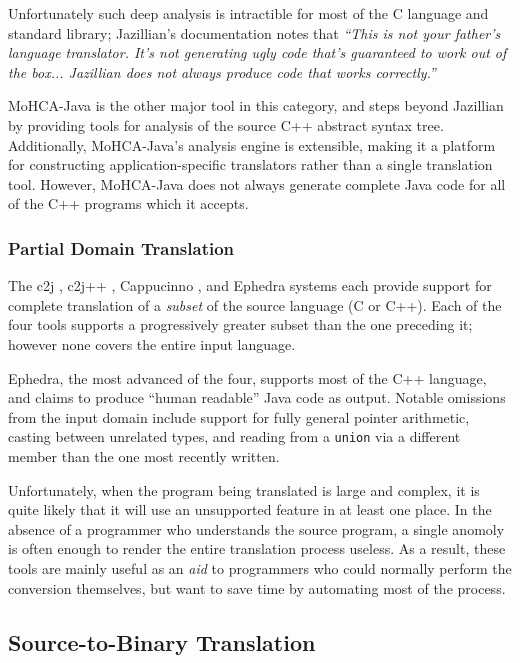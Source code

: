 \documentclass{acmconf}
\begin{document}
Unfortunately such deep analysis is intractible for most of the C
language and standard library; Jazillian's documentation notes that
{\it ``This is not your father's language translator.  It's not
generating ugly code that's guaranteed to work out of the
box... Jazillian does not always produce code that works correctly.''}

MoHCA-Java \cite{mohca} is the other major tool in this category, and steps
beyond Jazillian by providing tools for analysis of the source C++
abstract syntax tree.  Additionally, MoHCA-Java's analysis engine is
extensible, making it a platform for constructing application-specific
translators rather than a single translation tool.  However,
MoHCA-Java does not always generate complete Java code for all of the C++
programs which it accepts.


\subsubsection{Partial Domain Translation}

The c2j \cite{c2j}, c2j++ \cite{c2jpp}, Cappucinno \cite{capp},
and Ephedra \cite{ephedra} systems each provide support for complete
translation of a {\it subset} of the source language (C or C++).  Each
of the four tools supports a progressively greater subset than the one
preceding it; however none covers the entire input language.

Ephedra, the most advanced of the four, supports most of the C++
language, and claims to produce ``human readable'' Java code as
output.  Notable omissions from the input domain include support for
fully general pointer arithmetic, casting between unrelated types, and
reading from a {\tt union} via a different member than the one most
recently written.

Unfortunately, when the program being translated is large and complex,
it is quite likely that it will use an unsupported feature in at least
one place.  In the absence of a programmer who understands the source
program, a single anomoly is often enough to render the entire
translation process useless.  As a result, these tools are mainly
useful as an {\it aid} to programmers who could normally perform the
conversion themselves, but want to save time by automating most of the
process.


\subsection{Source-to-Binary Translation}
\end{document}
